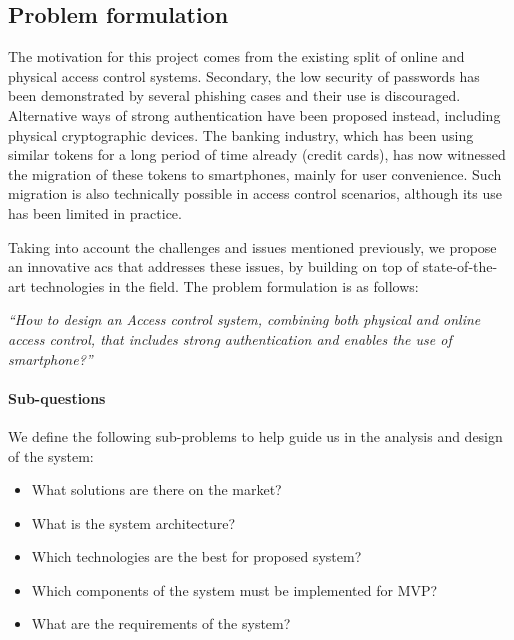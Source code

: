 \subsection{Problem formulation} \label{problemFormulation}
The motivation for this project comes from the existing split of online and physical access control systems. Secondary, the low security of passwords has been demonstrated by several phishing cases and their use is discouraged.
Alternative ways of strong authentication have been proposed instead, including physical cryptographic devices.
The banking industry, which has been using similar tokens for a long period of time already (credit cards), has now witnessed the migration of these tokens to smartphones, mainly for user convenience.
Such migration is also technically possible in access control scenarios, although its use has been limited in practice.

Taking into account the challenges and issues mentioned previously, we propose an innovative \acrshort{acs} that addresses these issues, by building on top of state-of-the-art technologies in the field. The problem formulation is as follows:

\begin{center}
    \textit{“How to design an Access control system, combining both physical and online access control, that includes strong authentication and enables the use of smartphone?”}
\end{center}

\paragraph{Sub-questions}
We define the following sub-problems to help guide us in the analysis and design of the system:

\begin{itemize}[noitemsep]
    \item What solutions are there on the market?
    \item What is the system architecture?
    \item Which technologies are the best for proposed system?
    \item Which components of the system must be implemented for MVP?
    \item What are the requirements of the system?
\end{itemize}